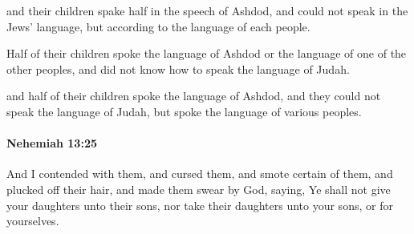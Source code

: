 			\begin{versebox}
					\item[BHS] 
					\item[LXX] 
					\item[ASV] and their children spake half in the speech of Ashdod, and could not speak in the Jews' language, but according to the language of each people.
					\item[NIV] Half of their children spoke the language of Ashdod or the language of one of the other peoples, and did not know how to speak the language of Judah.
					\item[NRSV] and half of their children spoke the language of Ashdod, and they could not speak the language of Judah, but spoke the language of various peoples.
			\end{versebox}

		\paragraph{Nehemiah 13:25} %
			\label{NEHEMIAH-13-25}

			And I contended with them, and cursed them, and smote certain of them, and plucked off their hair, and made them swear by God, saying, Ye shall not give your daughters unto their sons, nor take their daughters unto your sons, or for yourselves.

